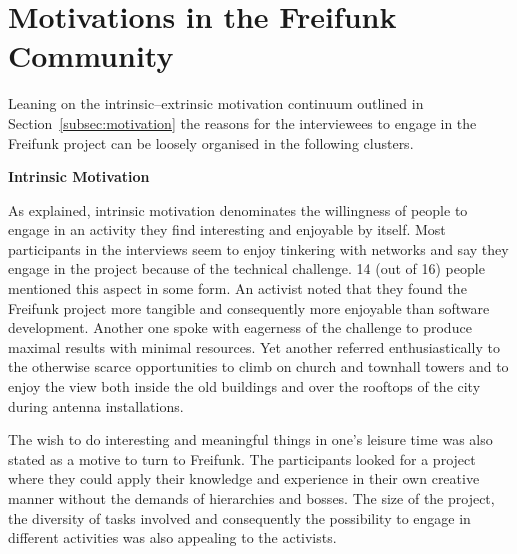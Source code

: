 \section{Motivations in the Freifunk Community}

\begin{comment}
\begin{itemize}
  \item is the focus of the paper;
  \item only pull up the foss motivations as comparison to underline similarities and differences with the findings here
  \item general part of the questionnaire $\rightarrow$ cluster answers
  \item some graphs/tables on the specific questions
\end{itemize}
\end{comment}

Leaning on the intrinsic--extrinsic motivation continuum outlined in Section~\ref{subsec:motivation} the reasons for the interviewees to engage in the Freifunk project can be loosely organised in the following clusters.

\textbf{Intrinsic Motivation}

As explained, intrinsic motivation denominates the willingness of people to engage in an activity they find interesting and enjoyable by itself.
Most participants in the interviews seem to enjoy tinkering with networks and say they engage in the project because of the technical challenge.
14 (out of 16) people mentioned this aspect in some form.
An activist noted that they found the Freifunk project more tangible and consequently more enjoyable than software development.
Another one spoke with eagerness of the challenge to produce maximal results with minimal resources.
Yet another referred enthusiastically to the otherwise scarce opportunities to climb on church and townhall towers and to enjoy the view both inside the old buildings and over the rooftops of the city during antenna installations.

The wish to do interesting and meaningful things in one's leisure time was also stated as a motive to turn to Freifunk.
The participants looked for a project where they could apply their knowledge and experience in their own creative manner without the demands of hierarchies and bosses.
The size of the project, the diversity of tasks involved and consequently the possibility to engage in different activities was also appealing to the activists.

